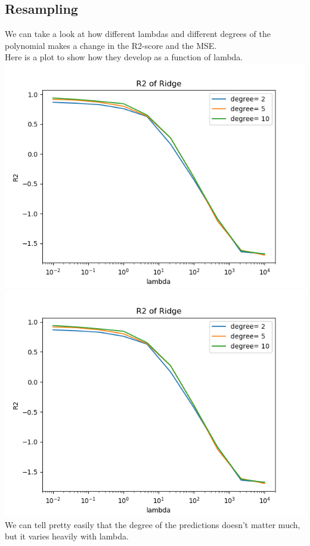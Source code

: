 \documentclass[a4paper,norsk]{article}
\begin{document}
\subsection*{Resampling}
We can take a look at how different lambdas and different degrees of the polynomial makes a change in the R2-score and the MSE.
\\Here is a plot to show how they develop as a function of lambda.
\\ \includegraphics[scale=.7]{MSERidge}
\\ \includegraphics[scale=.7]{R2Ridge}
\\ We can tell pretty easily that the degree of the predictions doesn't matter much, but it varies heavily with lambda.
\end{document}
